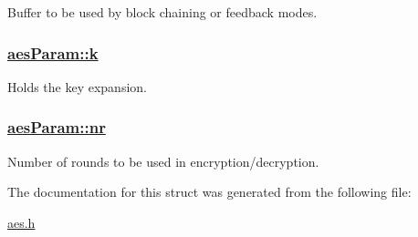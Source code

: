 Buffer to be used by block chaining or feedback modes. 

\hypertarget{structaesParam_o0}{
\subsubsection[k]{\setlength{\rightskip}{0pt plus 5cm}\hyperlink{structaesParam_o0}{aes\-Param::k}}}
\label{structaesParam_o0}


Holds the key expansion. 

\hypertarget{structaesParam_o1}{
\subsubsection[nr]{\setlength{\rightskip}{0pt plus 5cm}\hyperlink{structaesParam_o1}{aes\-Param::nr}}}
\label{structaesParam_o1}


Number of rounds to be used in encryption/decryption. 



The documentation for this struct was generated from the following file:\begin{CompactItemize}
\item 
\hyperlink{aes_8h}{aes.h}\end{CompactItemize}
